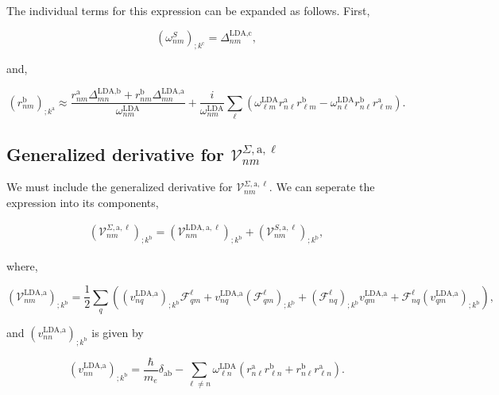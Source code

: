 \documentclass[11pt]{article}
\begin{document}
The individual terms for this expression can be expanded as follows. First,

\begin{equation}\label{eli.1}
\left(\omega^S_{nm}\right)_{;k^{\text{c}}} = \Delta^{\text{LDA},\text{c}}_{nm},
\end{equation}

and,

\begin{equation}\label{eli.2}
(r^{\text{b}}_{nm})_{;k^{\text{a}}} \approx \frac{r^{\text{a}}_{nm}\Delta^{\text{LDA},\text{b}}_{mn} + r^{\text{b}}_{nm}\Delta^{\text{LDA},\text{a}}_{mn}}{\omega^\text{LDA}_{nm}} + \frac{i}{\omega^\text{LDA}_{nm}}\sum_{\ell}\left(\omega^\text{LDA}_{\ell m}r^{\text{a}}_{n\ell}r^{\text{b}}_{\ell m} - \omega^\text{LDA}_{n\ell}r^{\text{b}}_{n\ell}r^{\text{a}}_{\ell m}\right).
\end{equation}

\subsection{Generalized derivative for \texorpdfstring{$\mathcal{V}^{\Sigma,\text{a},\ell}_{nm}$}{V-Sigma}}

We must include the generalized derivative for $\mathcal{V}^{\Sigma,\text{a},\ell}_{nm}$. We can seperate the expression into its components,

\begin{eqnarray}\label{a.1}
\left(\mathcal{V}^{\Sigma,\text{a},\ell}_{nm}\right)_{;k^\text{b}} = \left(\mathcal{V}^{\text{LDA},\text{a},\ell}_{nm}\right)_{;k^\text{b}} + \left(\mathcal{V}^{S,\text{a},\ell}_{nm}\right)_{;k^\text{b}},
\end{eqnarray}

where, %

\begin{equation}\label{a.2}
\left(\mathcal{V}^{\text{LDA},\text{a}}_{nm}\right)_{;k^\text{b}} = \frac{1}{2}\sum_q\left((v^{\text{LDA},\text{a}}_{nq})_{;k^\text{b}}\mathcal{F}^\ell_{qm} + v^{\text{LDA},\text{a}}_{nq}(\mathcal{F}^\ell_{qm})_{;k^\text{b}} + (\mathcal{F}^\ell_{nq})_{;k^\text{b}} v^{\text{LDA},\text{a}}_{qm} + \mathcal{F}^\ell_{nq} (v^{\text{LDA},\text{a}}_{qm})_{;k^\text{b}}\right),
\end{equation} 

and $\left(v^{\text{LDA},\text{a}}_{nn}\right)_{;k^\text{b}}$ is given by

\begin{equation}
\left(v^{\text{LDA},\text{a}}_{nn}\right)_{;k^\text{b}} = \frac{\hbar}{m_e}\delta_{\text{a}\text{b}} - \sum_{\ell\ne n}\omega^\text{LDA}_{\ell n}\left(r^{\text{a}}_{n\ell}r^\text{b}_{\ell n} + r^\text{b}_{n\ell}r^{\text{a}}_{\ell n}\right).
\end{equation}
\end{document}
